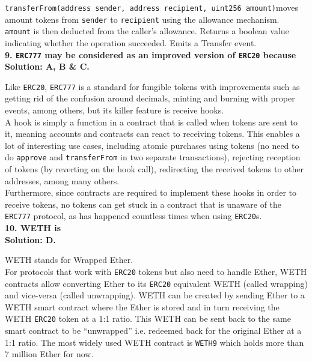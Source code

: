 \texttt{transferFrom(address sender, address recipient, uint256 amount)}\linebreak moves amount tokens from \verb|sender| to \verb|recipient| using the allowance mechanism.
\verb|amount| is then deducted from the caller's allowance.
Returns a boolean value indicating whether the operation succeeded.
Emits a Transfer event.\\

\textbf{9. \texttt{ERC777} may be considered as an improved version of \texttt{ERC20} because}\label{sec:exam3_q9}\\

\textbf{Solution: A, B \& C.}

Like \verb|ERC20|, \verb|ERC777| is a standard for fungible tokens with improvements such as getting rid of the confusion around decimals, minting and burning with proper events, among others, but its killer feature is receive hooks.\\

A hook is simply a function in a contract that is called when tokens are sent to it, meaning accounts and contracts can react to receiving tokens.
This enables a lot of interesting use cases, including atomic purchases using tokens (no need to do \verb|approve| and \verb|transferFrom| in two separate transactions), rejecting reception of tokens (by reverting on the hook call), redirecting the received tokens to other addresses, among many others.\\

Furthermore, since contracts are required to implement these hooks in order to receive tokens, no tokens can get stuck in a contract that is unaware of the \verb|ERC777| protocol, as has happened countless times when using \verb|ERC20|s.\\

\textbf{10. WETH is}\label{sec:exam3_q10}\\

\textbf{Solution: D.}

WETH stands for Wrapped Ether.\\
For protocols that work with \verb|ERC20| tokens but also need to handle Ether, WETH contracts allow converting Ether to its \verb|ERC20| equivalent WETH (called wrapping) and vice-versa (called unwrapping).
WETH can be created by sending Ether to a WETH smart contract where the Ether is stored and in turn receiving the WETH \verb|ERC20| token at a 1:1 ratio.
This WETH can be sent back to the same smart contract to be ``unwrapped'' i.e. redeemed back for the original Ether at a 1:1 ratio.
The most widely used WETH contract is \verb|WETH9| which holds more than 7 million Ether for now.\\

